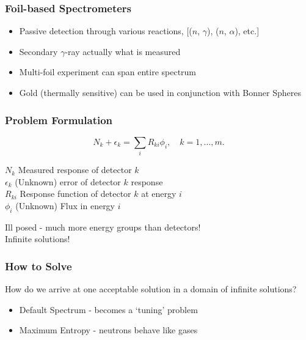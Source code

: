 \documentclass[fleqn]{beamer}
\begin{document}
\begin{frame}
\frametitle{Foil-based Spectrometers}

\begin{itemize}
\item Passive detection through various reactions, [($n$, $\gamma$), ($n$, $\alpha$), etc.]
\item Secondary $\gamma$-ray actually what is measured
\item Multi-foil experiment can span entire spectrum \cite{james2001spectral}
\item Gold (thermally sensitive) can be used in conjunction with Bonner Spheres \cite{viererbl2012comparison}
\end{itemize}

\end{frame}

\begin{frame}
\frametitle{Problem Formulation}
\begin{equation}
\label{eqn:disc-response}
N_k + \epsilon_k = \sum_i R_{ki} \phi_i, \quad k = 1,\ldots, m .
\end{equation}

$N_k$ Measured response of detector $k$\\
$\epsilon_k$ (Unknown) error of detector $k$ response\\
$R_{ki}$ Response function of detector $k$ at energy $i$\\
$\phi_i$ (Unknown) Flux in energy $i$\\
\vspace{0.05\textheight}

Ill posed - much more energy groups than detectors!\\
Infinite solutions!

\end{frame}


\begin{frame}
\frametitle{How to Solve}

How do we arrive at one acceptable solution in a domain of infinite solutions?

\begin{itemize}
\item Default Spectrum - becomes a `tuning' problem
\item Maximum Entropy - neutrons behave like gases
\end{itemize}

\end{frame}
\end{document}
